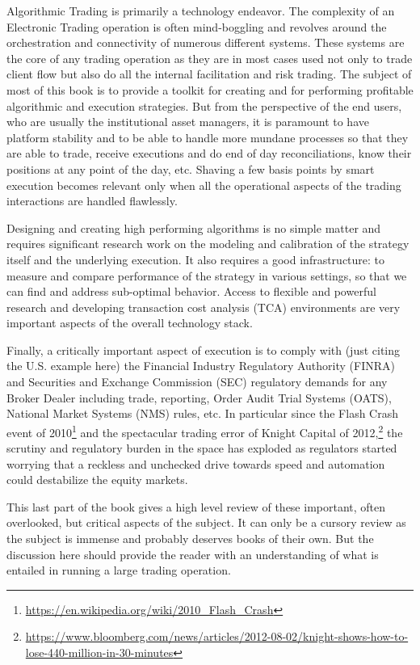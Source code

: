 
Algorithmic Trading is primarily a technology endeavor. The complexity of an Electronic Trading operation is often mind-boggling and revolves around the orchestration and connectivity of numerous different systems. These systems are the core of any trading operation as they are in most cases used not only to trade client flow but also do all the internal facilitation and risk trading. The subject of most of this book is to provide a toolkit for creating and for performing profitable algorithmic and execution strategies. But from the perspective of the end users, who are usually the institutional asset managers, it is paramount to have platform stability and to be able to handle more mundane processes so that they are able to trade, receive executions and do end of day reconciliations, know their positions at any point of the day, etc. Shaving a few basis points by smart execution becomes relevant only when all the operational aspects of the trading interactions are handled flawlessly.


Designing and creating high performing algorithms is no simple matter and requires significant research work on the modeling and calibration of the strategy itself and the underlying execution. It also requires a good infrastructure: to measure and compare performance of the strategy in various settings, so that we can find and address sub-optimal behavior. Access to flexible and powerful research and developing transaction cost analysis (TCA) environments are very important aspects of the overall technology stack.

Finally, a critically important aspect of execution is to comply with (just citing the U.S. example here) the Financial Industry Regulatory Authority (FINRA) and Securities and Exchange Commission (SEC) regulatory demands for any Broker Dealer including trade, reporting, Order Audit Trial Systems (OATS), National Market Systems (NMS) rules, etc. In particular since the Flash Crash event of 2010\footnote{\url{https://en.wikipedia.org/wiki/2010_Flash_Crash}} and the spectacular trading error of Knight Capital of 2012,\footnote{\url{https://www.bloomberg.com/news/articles/2012-08-02/knight-shows-how-to-lose-440-million-in-30-minutes}} the scrutiny and regulatory burden in the space has exploded as regulators started worrying that a reckless and unchecked drive towards speed and automation could destabilize the equity markets.  

This last part of the book gives a high level review of these important, often overlooked, but critical aspects of the subject. It can only be a cursory review as the subject is immense and probably deserves books of their own. But the discussion here should provide the reader with an understanding of what is entailed in running a large trading operation.